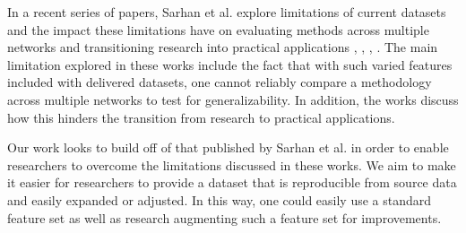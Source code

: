\documentclass[sigconf]{acmart}
\begin{document}
In a recent series of papers, Sarhan et al. explore limitations of current datasets and the impact these limitations have on evaluating methods across multiple networks and transitioning research into practical applications \cite{sarhan2020netflow}, \cite{sarhan2021cyber}, \cite{Sarhan2021}, \cite{sarhan_arxiv2021}.
The main limitation explored in these works include the fact that with such varied features included with delivered datasets, one cannot reliably compare a methodology across multiple networks to test for generalizability.
In addition, the works discuss how this hinders the transition from research to practical applications. 

Our work looks to build off of that published by Sarhan et al. in order to enable researchers to overcome the limitations discussed in these works.
We aim to make it easier for researchers to provide a dataset that is reproducible from source data and easily expanded or adjusted.
In this way, one could easily use a standard feature set as well as research augmenting such a feature set for improvements.
\end{document}
